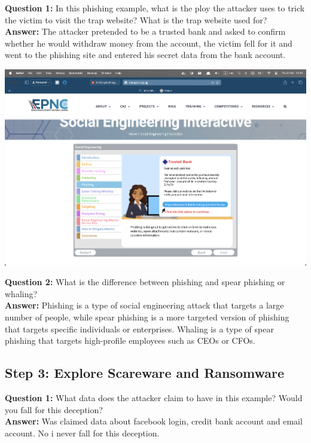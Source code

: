 \documentclass{article}
\begin{document}
\textbf{Question 1: } In this phishing example, what is the ploy the attacker uses to trick the victim to visit the trap website? What is the trap website used for? \\
\textbf{Answer: } The attacker pretended to be a trusted bank and asked to confirm whether he would withdraw money from the account, the victim fell for it and went to the phishing site and entered his secret data from the bank account. \\

\vspace{1\baselineskip}

\includegraphics[width=1\textwidth]{4.png}

\vspace{1\baselineskip}

\textbf{Question 2: } What is the difference between phishing and spear phishing or whaling? \\
\textbf{Answer: } Phishing is a type of social engineering attack that targets a large number of people, while spear phishing is a more targeted version of phishing that targets specific individuals or enterprises. Whaling is a type of spear phishing that targets high-profile employees such as CEOs or CFOs. \\

\newpage

\subsection*{Step 3: Explore Scareware and Ransomware}

\textbf{Question 1: }What data does the attacker claim to have in this example? Would you fall for this deception? \\
\textbf{Answer: } Was claimed data about facebook login, credit bank account and email account. No i never fall for this deception. \\
\end{document}
